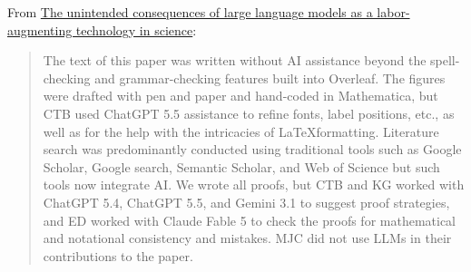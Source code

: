 \documentclass[11pt]{article}
\begin{document}
From \href{https://arxiv.org/pdf/2607.17397}{The unintended consequences of large language models as a labor-augmenting technology in science}:
\begin{quote}
The text of this paper was written without AI assistance beyond the spell-checking and grammar-checking features built into Overleaf. The figures were drafted with pen and paper and hand-coded in Mathematica, but CTB used ChatGPT 5.5 assistance to refine fonts, label positions, etc., as well as for the help with the intricacies of \LaTeX formatting. Literature search was predominantly conducted using traditional tools such as Google Scholar, Google search, Semantic Scholar, and Web of Science but such tools now integrate AI. We wrote all proofs, but CTB and KG worked with ChatGPT 5.4, ChatGPT 5.5, and Gemini 3.1 to suggest proof strategies, and ED worked with Claude Fable 5 to check the proofs for mathematical and notational consistency and mistakes. MJC did not use LLMs in their contributions to the paper.
\end{quote}
\end{document}
